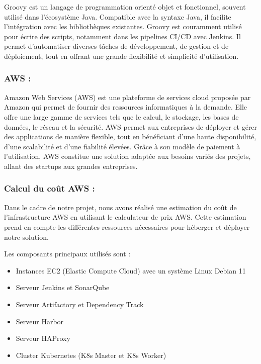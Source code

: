 Groovy est un langage de programmation orienté objet et fonctionnel, souvent utilisé dans l’écosystème Java. Compatible avec la syntaxe Java, il facilite l’intégration avec les bibliothèques existantes. Groovy est couramment utilisé pour écrire des scripts, notamment dans les pipelines CI/CD avec Jenkins. Il permet d’automatiser diverses tâches de développement, de gestion et de déploiement, tout en offrant une grande flexibilité et simplicité d’utilisation.
\subsubsection{AWS :}

Amazon Web Services (AWS) est une plateforme de services cloud proposée par Amazon qui permet de fournir des ressources informatiques à la demande. Elle offre une large gamme de services tels que le calcul, le stockage, les bases de données, le réseau et la sécurité. AWS permet aux entreprises de déployer et gérer des applications de manière flexible, tout en bénéficiant d’une haute disponibilité, d’une scalabilité et d’une fiabilité élevées. Grâce à son modèle de paiement à l’utilisation, AWS constitue une solution adaptée aux besoins variés des projets, allant des startups aux grandes entreprises.

\subsubsection{Calcul du coût AWS :}

Dans le cadre de notre projet, nous avons réalisé une estimation du coût de l’infrastructure AWS en utilisant le calculateur de prix AWS. Cette estimation prend en compte les différentes ressources nécessaires pour héberger et déployer notre solution.

Les composants principaux utilisés sont :

\begin{itemize}
    \item Instances EC2 (Elastic Compute Cloud) avec un système Linux Debian 11
    \item Serveur Jenkins et SonarQube
    \item Serveur Artifactory et Dependency Track
    \item Serveur Harbor
    \item Serveur HAProxy
    \item Cluster Kubernetes (K8s Master et K8s Worker)
\end{itemize}

